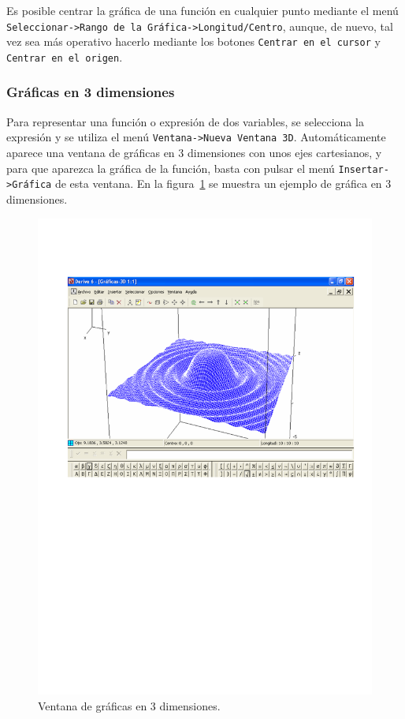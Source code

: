 Es posible centrar la gráfica de una función en cualquier punto
mediante el menú \texttt{Seleccionar->Rango de la
Gráfica->Longitud/Centro}, aunque, de nuevo, tal vez sea más
operativo hacerlo mediante los botones \texttt{Centrar en el cursor}
y \texttt{Centrar en el origen}.

\subsubsection*{Gráficas en 3 dimensiones}
Para representar una función o expresión de dos variables, se
selecciona la expresión y se utiliza el menú \texttt{Ventana->Nueva
Ventana 3D}. Automáticamente aparece una ventana de gráficas en 3
dimensiones con unos ejes cartesianos, y para que aparezca la
gráfica de la función, basta con pulsar el menú
\texttt{Insertar->Gráfica} de esta ventana. En la
figura~\ref{g:3d-plot} se muestra un ejemplo de gráfica en 3
dimensiones.

\begin{figure}[h!]
\begin{center}
\includegraphics[scale=0.9]{img/introduccion_derive/3d-plot}
\caption{Ventana de gráficas en 3 dimensiones.} \label{g:3d-plot}
\end{center}
\end{figure}

